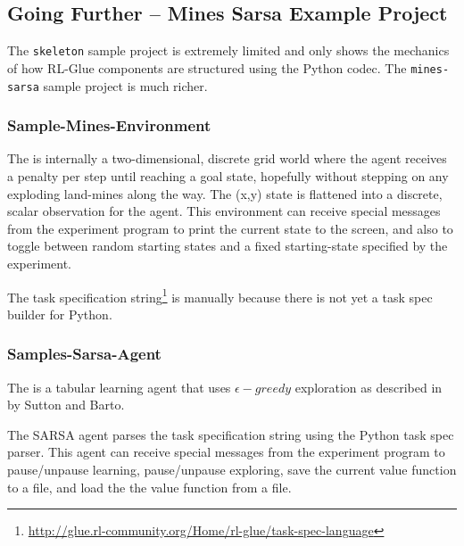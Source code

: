 \documentclass[11pt]{article}
\begin{document}
\subsection{Going Further -- Mines Sarsa Example Project}
\label{mines-sarsa-sample}
The \texttt{skeleton} sample project is extremely limited and only shows the mechanics of how RL-Glue components are structured using the Python codec.  The \texttt{mines-sarsa} sample project is much richer.

\subsubsection{Sample-Mines-Environment}
\label{mines-sample}
The 
is internally a two-dimensional, discrete grid world where the agent receives a penalty per step until reaching a goal state, hopefully without stepping on any exploding land-mines along the way.  The (x,y) state is flattened into a discrete, scalar observation for the agent.  This environment can receive special messages from the experiment program to print the current state to the screen, and also to toggle between random starting states and a fixed starting-state specified by the experiment.

The task specification string\footnote{\url{http://glue.rl-community.org/Home/rl-glue/task-spec-language}} is manually because there is not yet a task spec builder for Python. 

\subsubsection{Samples-Sarsa-Agent}
\label{sarsa-sample}
The 
is a tabular learning agent that uses $\epsilon-greedy$ exploration as described in  by Sutton and Barto.

The SARSA agent parses the task specification string using the Python task spec parser.  This agent can receive special messages from the experiment program to pause/unpause learning, pause/unpause exploring, save the current value function to a file, and load the the value function from a file.
\end{document}
